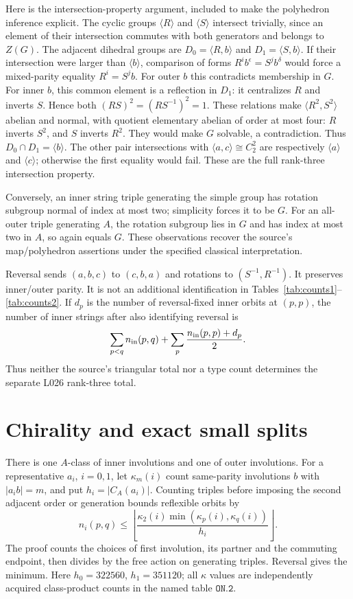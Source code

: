 \documentclass[11pt,a4paper]{article}
\newcommand{\gen}[1]{\langle #1\rangle}
\begin{document}
Here is the intersection-property argument, included to make the
polyhedron inference explicit. The cyclic groups $\gen R$ and $\gen S$
intersect trivially, since an element of their intersection commutes with
both generators and belongs to $Z(G)$. The adjacent dihedral groups are
$D_0=\gen{R,b}$ and $D_1=\gen{S,b}$. If their intersection were larger
than $\gen b$, comparison of forms $R^i b^\epsilon=S^j b^\delta$
would force a mixed-parity equality $R^i=S^j b$. For outer $b$ this
contradicts membership in $G$. For inner $b$, this common element is a
reflection in $D_1$: it centralizes $R$ and inverts $S$. Hence both
$(RS)^2=(RS^{-1})^2=1$. These relations make
$\gen{R^2,S^2}$ abelian and normal, with quotient elementary abelian
of order at most four: $R$ inverts $S^2$, and $S$ inverts $R^2$.
They would make $G$ solvable, a contradiction. Thus $D_0\cap D_1=\gen b$.
The other pair intersections with $\gen{a,c}\cong C_2^2$ are respectively
$\gen a$ and $\gen c$; otherwise the first equality would fail. These
are the full rank-three intersection property.

Conversely, an inner string triple generating the simple group has
rotation subgroup normal of index at most two; simplicity forces it to
be $G$. For an all-outer triple generating $A$, the rotation subgroup
lies in $G$ and has index at most two in $A$, so again equals $G$.
These observations recover the source's map/polyhedron assertions under
the specified classical interpretation.

Reversal sends $(a,b,c)$ to $(c,b,a)$ and rotations to
$(S^{-1},R^{-1})$. It preserves inner/outer parity. It is not an
additional identification in Tables~\ref{tab:counts1}--\ref{tab:counts2}.
If $d_p$ is the number of reversal-fixed inner orbits at $(p,p)$, the
number of inner strings after also identifying reversal is
\[
 \sum_{p<q}n_{\rm in}(p,q)+\sum_p
          \frac{n_{\rm in}(p,p)+d_p}{2}.
\]
Thus neither the source's triangular total nor a type count determines
the separate L026 rank-three total.

\section{Chirality and exact small splits}\label{sec:chirality}
There is one $A$-class of inner involutions and one of outer involutions.
For a representative $a_i$, $i=0,1$, let
$\kappa_m(i)$ count same-parity involutions $b$ with $|a_i b|=m$,
and put $h_i=|C_A(a_i)|$. Counting triples before imposing the second
adjacent order or generation bounds reflexible orbits by
\[
 n_i(p,q)\leq
 \left\lfloor\frac{\kappa_2(i)\min(\kappa_p(i),\kappa_q(i))}{h_i}\right\rfloor.
\]
The proof counts the choices of first involution, its partner and the
commuting endpoint, then divides by the free action on generating
triples. Reversal gives the minimum. Here
$h_0=322560$, $h_1=351120$; all $\kappa$ values are independently acquired
class-product counts in the named table $\texttt{ON.2}$.
\end{document}
